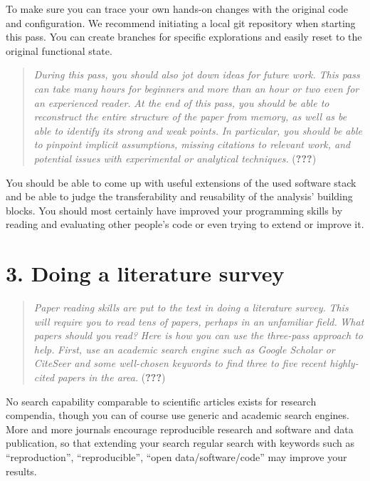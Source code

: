\documentclass[twocolumn]{article}
\begin{document}
To make sure you can trace your own hands-on changes with the original
code and configuration. We recommend initiating a local git repository
when starting this pass. You can create branches for specific
explorations and easily reset to the original functional state.

\begin{quote}
\emph{During this pass, you should also jot down ideas for future work.}
\emph{This pass can take many hours for beginners and more than an hour
or two even for an experienced reader.} \emph{At the end of this pass,
you should be able to reconstruct the entire structure of the paper from
memory, as well as be able to identify its strong and weak points.}
\emph{In particular, you should be able to pinpoint implicit
assumptions, missing citations to relevant work, and potential issues
with experimental or analytical techniques.} ({\textbf{???}})
\end{quote}

You should be able to come up with useful extensions of the used
software stack and be able to judge the transferability and reusability
of the analysis' building blocks. You should most certainly have
improved your programming skills by reading and evaluating other
people's code or even trying to extend or improve it.

\hypertarget{doing-a-literature-survey}{%
\section*{3. Doing a literature
survey}\label{doing-a-literature-survey}}

\begin{quote}
\emph{Paper reading skills are put to the test in doing a literature
survey.} \emph{This will require you to read tens of papers, perhaps in
an unfamiliar field.} \emph{What papers should you read?} \emph{Here is
how you can use the three-pass approach to help.} \emph{First, use an
academic search engine such as Google Scholar or CiteSeer and some
well-chosen keywords to find three to five recent highly-cited papers in
the area.} ({\textbf{???}})
\end{quote}

No search capability comparable to scientific articles exists for
research compendia, though you can of course use generic and academic
search engines. More and more journals encourage reproducible research
and software and data publication, so that extending your search regular
search with keywords such as ``reproduction'', ``reproducible'', ``open
data/software/code'' may improve your results.
\end{document}
